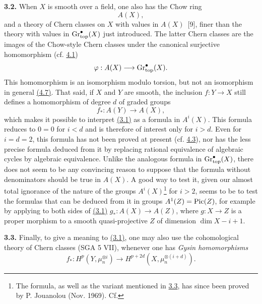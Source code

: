 \textbf{3.2.} When $X$ is smooth over a field, one also has the Chow ring
\[
  A(X),
\]
and a theory of Chern classes on $X$ with values in $A(X)$~[9], finer than the theory with values in $\operatorname{Gr}_{\mathrm{top}}^\bullet(X)$ just introduced. The latter Chern classes are the images of the Chow-style Chern classes under the canonical surjective homomorphism (cf. \hyperlink{sga6.e14.para.4-1}{4.1})
\[
  \varphi:A(X)\longrightarrow\operatorname{Gr}_{\mathrm{top}}^\bullet(X).
\]
This homomorphism is an isomorphism modulo torsion, but not an isomorphism in general \hyperlink{sga6.e14.para.4-7}{(4.7)}. That said, if $X$ and $Y$ are smooth, the inclusion $f:Y\to X$ still defines a homomorphism of degree $d$ of graded groups
\[
  f_*:A(Y)\longrightarrow A(X),
\]
which makes it possible to interpret \hyperlink{sga6.e14.eq.3-1}{(3.1)} as a formula in $A^i(X)$.
This formula reduces to $0=0$ for $i<d$ and is therefore of interest
only for $i>d$. Even for $i=d=2$, this formula has not been proved at
present (cf. \hyperlink{sga6.e14.para.4-3}{4.3}), nor has the less precise formula deduced from it by
replacing rational equivalence of algebraic cycles by algebraic
equivalence. Unlike the analogous formula in $\operatorname{Gr}_{\mathrm{top}}^\bullet(X)$, there
does not seem to be any convincing reason to suppose that the formula
without denominators should be true in $A(X)$. A good way to test it,
given our almost total ignorance of the nature of the groups
$A^i(X)$\footnote{The formula, as well as the variant mentioned in \hyperlink{sga6.e14.para.3-3}{3.3},
has since been proved by P. Jouanolou (Nov. 1969). Cf.} for $i>2$, seems
to be to test the formulas that can be deduced from it in groups
$A^1(Z)=\operatorname{Pic}(Z)$, for example by applying to both sides of \hyperlink{sga6.e14.eq.3-1}{(3.1)}
$g_*:A(X)\longrightarrow A(Z)$,
where $g:X\to Z$ is a proper morphism to a smooth quasi-projective $Z$ of dimension $\dim X-i+1$.

\textbf{3.3.} Finally, to give a meaning to \hyperlink{sga6.e14.eq.3-1}{(3.1)}, one may also use the cohomological theory of Chern classes (SGA 5 VII), whenever one has \emph{Gysin homomorphisms}
\[
  f_*:H^p(Y,\mu_n^{\otimes i})
  \longrightarrow H^{p+2d}(X,\mu_n^{\otimes(i+d)}).
\]

